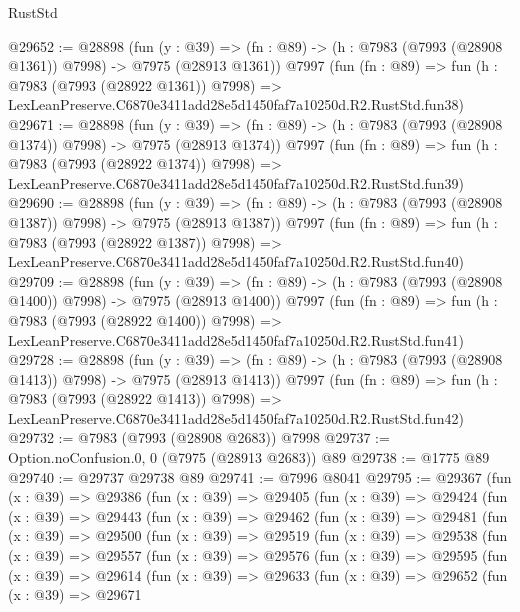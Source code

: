 \begin{lexlean}{RustStd}
\begin{coremodule}
@29652 := @28898
    (fun (y : @39) =>
    (fn : @89) -> (h : @7983 (@7993 (@28908 @1361)) @7998) -> @7975 (@28913 @1361))
    @7997
    (fun (fn : @89) =>
    fun (h : @7983 (@7993 (@28922 @1361)) @7998) =>
    LexLeanPreserve.C6870e3411add28e5d1450faf7a10250d.R2.RustStd.fun38)
@29671 := @28898
    (fun (y : @39) =>
    (fn : @89) -> (h : @7983 (@7993 (@28908 @1374)) @7998) -> @7975 (@28913 @1374))
    @7997
    (fun (fn : @89) =>
    fun (h : @7983 (@7993 (@28922 @1374)) @7998) =>
    LexLeanPreserve.C6870e3411add28e5d1450faf7a10250d.R2.RustStd.fun39)
@29690 := @28898
    (fun (y : @39) =>
    (fn : @89) -> (h : @7983 (@7993 (@28908 @1387)) @7998) -> @7975 (@28913 @1387))
    @7997
    (fun (fn : @89) =>
    fun (h : @7983 (@7993 (@28922 @1387)) @7998) =>
    LexLeanPreserve.C6870e3411add28e5d1450faf7a10250d.R2.RustStd.fun40)
@29709 := @28898
    (fun (y : @39) =>
    (fn : @89) -> (h : @7983 (@7993 (@28908 @1400)) @7998) -> @7975 (@28913 @1400))
    @7997
    (fun (fn : @89) =>
    fun (h : @7983 (@7993 (@28922 @1400)) @7998) =>
    LexLeanPreserve.C6870e3411add28e5d1450faf7a10250d.R2.RustStd.fun41)
@29728 := @28898
    (fun (y : @39) =>
    (fn : @89) -> (h : @7983 (@7993 (@28908 @1413)) @7998) -> @7975 (@28913 @1413))
    @7997
    (fun (fn : @89) =>
    fun (h : @7983 (@7993 (@28922 @1413)) @7998) =>
    LexLeanPreserve.C6870e3411add28e5d1450faf7a10250d.R2.RustStd.fun42)
@29732 := @7983 (@7993 (@28908 @2683)) @7998
@29737 := Option.noConfusion.{0, 0} (@7975 (@28913 @2683)) @89
@29738 := @1775 @89
@29740 := @29737 @29738 @89
@29741 := @7996 @8041
@29795 := @29367
    (fun (x : @39) =>
    @29386
      (fun (x : @39) =>
      @29405
        (fun (x : @39) =>
        @29424
          (fun (x : @39) =>
          @29443
            (fun (x : @39) =>
            @29462
              (fun (x : @39) =>
              @29481
                (fun (x : @39) =>
                @29500
                  (fun (x : @39) =>
                  @29519
                    (fun (x : @39) =>
                    @29538
                      (fun (x : @39) =>
                      @29557
                        (fun (x : @39) =>
                        @29576
                          (fun (x : @39) =>
                          @29595
                            (fun (x : @39) =>
                            @29614
                              (fun (x : @39) =>
                              @29633
                                (fun (x : @39) =>
                                @29652
                                  (fun (x : @39) =>
                                  @29671

\end{coremodule}
\end{lexlean}
